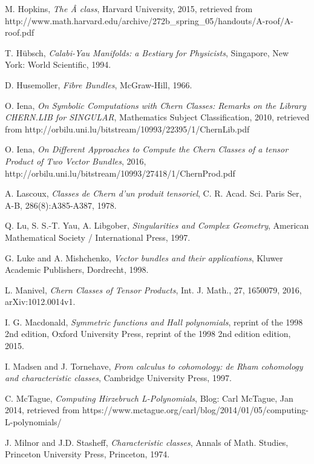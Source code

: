 \documentclass{amsart}
\theoremstyle{plain}
\numberwithin{equation}{section}
\begin{document}
\begin{thebibliography}{99}
 M. Hopkins, \emph{The \^{A} class}, Harvard University, 2015, retrieved from	\newline http://www.math.harvard.edu/archive/272b\_spring\_05/handouts/A-roof/A-roof.pdf

 T. H\"ubsch, \textit{Calabi-Yau Manifolds: a Bestiary for Physicists}, Singapore, New York: World Scientific, 1994.

 D. Husemoller, \textit{Fibre Bundles},  McGraw-Hill, 1966.

 O. Iena,
\emph{On Symbolic Computations with Chern Classes: Remarks on the Library CHERN.LIB for SINGULAR},
Mathematics Subject Classification, 2010, retrieved from http://orbilu.uni.lu/bitstream/10993/22395/1/ChernLib.pdf

 O. Iena, \textit{On Different Approaches to Compute the Chern Classes of a tensor Product of Two Vector Bundles}, 2016, http://orbilu.uni.lu/bitstream/10993/27418/1/ChernProd.pdf

 A. Lascoux, \textit{Classes de Chern d'un produit tensoriel}, C. R. Acad. Sci. Paris Ser, A-B, 286(8):A385-A387, 1978.

 Q. Lu, S. S.-T. Yau, A. Libgober, \textit{Singularities and Complex Geometry}, American Mathematical Society / International Press, 1997.


G. Luke and A. Mishchenko, 
{\it Vector bundles and their applications},
Kluwer Academic Publishers, Dordrecht, 1998. 


 L. Manivel,
\emph{Chern Classes of Tensor Products}, Int. J. Math., 27, 1650079, 2016, arXiv:1012.0014v1.

 I. G. Macdonald, \textit{Symmetric  functions and Hall  polynomials}, reprint of the 1998 2nd edition, Oxford University Press, reprint of the 1998 2nd edition edition, 2015.

 I. Madsen and J. Tornehave, {\it From calculus to cohomology: de Rham cohomology
and characteristic classes}, Cambridge University Press, 1997.

 C. McTague,
\emph{Computing Hirzebruch L-Polynomials}, Blog: Carl McTague, Jan 2014, retrieved from \newline
https://www.mctague.org/carl/blog/2014/01/05/computing-L-polynomials/

 J. Milnor and J.D. Stasheff, \emph{Characteristic classes},
Annals of Math. Studies, Princeton University Press, Princeton, 1974.


\end{thebibliography}
\end{document}
